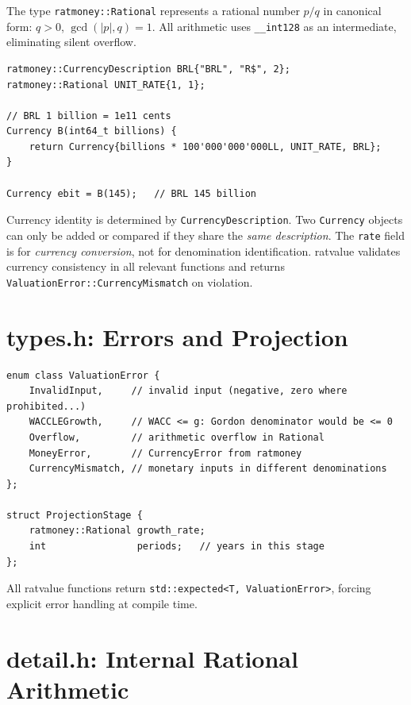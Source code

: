 \documentclass[12pt, a4paper, oneside]{book}
\begin{document}
The type \texttt{ratmoney::Rational} represents a rational number $p/q$ in
canonical form: $q > 0$, $\gcd(|p|, q) = 1$. All arithmetic uses
\texttt{\_\_int128} as an intermediate, eliminating silent overflow.

\begin{lstlisting}[style=cpp, caption={Creating currency values in ratvalue}]
ratmoney::CurrencyDescription BRL{"BRL", "R$", 2};
ratmoney::Rational UNIT_RATE{1, 1};

// BRL 1 billion = 1e11 cents
Currency B(int64_t billions) {
    return Currency{billions * 100'000'000'000LL, UNIT_RATE, BRL};
}

Currency ebit = B(145);   // BRL 145 billion
\end{lstlisting}

\begin{warning}
Currency identity is determined by \texttt{CurrencyDescription}.
Two \texttt{Currency} objects can only be added or compared if they share the
\emph{same description}. The \texttt{rate} field is for \emph{currency
conversion}, not for denomination identification.
ratvalue validates currency consistency in all relevant functions and returns
\texttt{ValuationError::CurrencyMismatch} on violation.
\end{warning}

\section{types.h: Errors and Projection}

\begin{lstlisting}[style=cpp, caption={Core types in ratvalue}]
enum class ValuationError {
    InvalidInput,     // invalid input (negative, zero where prohibited...)
    WACCLEGrowth,     // WACC <= g: Gordon denominator would be <= 0
    Overflow,         // arithmetic overflow in Rational
    MoneyError,       // CurrencyError from ratmoney
    CurrencyMismatch, // monetary inputs in different denominations
};

struct ProjectionStage {
    ratmoney::Rational growth_rate;
    int                periods;   // years in this stage
};
\end{lstlisting}

All ratvalue functions return \texttt{std::expected<T, ValuationError>},
forcing explicit error handling at compile time.

\section{detail.h: Internal Rational Arithmetic}
\end{document}
